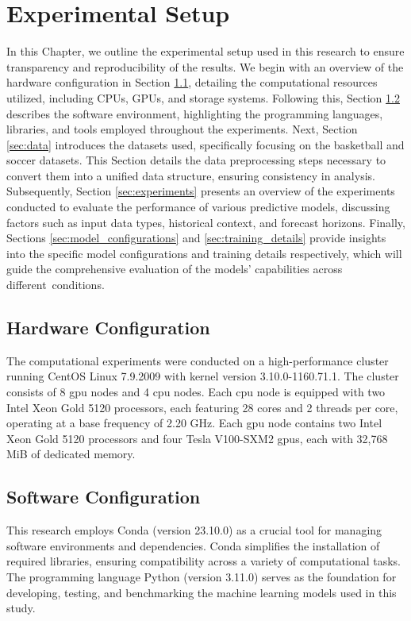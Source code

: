 \chapter{Experimental Setup}
\label{chapt:experimental_setup}
In this Chapter, we outline the experimental setup used in this research to ensure transparency and reproducibility of the results. We begin with an overview of the hardware configuration in Section \ref{sec:hardware}, detailing the computational resources utilized, including CPUs, GPUs, and storage systems. Following this, Section \ref{sec:software} describes the software environment, highlighting the programming languages, libraries, and tools employed throughout the experiments. Next, Section \ref{sec:data} introduces the datasets used, specifically focusing on the basketball and soccer datasets. This Section details the data preprocessing steps necessary to convert them into a unified data structure, ensuring consistency in analysis. Subsequently, Section \ref{sec:experiments} presents an overview of the experiments conducted to evaluate the performance of various predictive models, discussing factors such as input data types, historical context, and forecast horizons. Finally, Sections \ref{sec:model_configurations} and \ref{sec:training_details} provide insights into the specific model configurations and training details respectively, which will guide the comprehensive evaluation of the models' capabilities across different~conditions.


\section{Hardware Configuration}
\label{sec:hardware}
The computational experiments were conducted on a high-performance cluster running CentOS Linux 7.9.2009 with kernel version 3.10.0-1160.71.1. The cluster consists of 8 \gls{gpu} nodes and 4 \gls{cpu} nodes. Each \gls{cpu} node is equipped with two Intel Xeon Gold 5120 processors, each featuring 28 cores and 2 threads per core, operating at a base frequency of 2.20 GHz. Each \gls{gpu} node contains two Intel Xeon Gold 5120 processors and four Tesla V100-SXM2 \glspl{gpu}, each with 32,768 MiB of dedicated memory.

\section{Software Configuration}
\label{sec:software}

This research employs Conda (version 23.10.0) as a crucial tool for managing software environments and dependencies. Conda simplifies the installation of required libraries, ensuring compatibility across a variety of computational tasks. The programming language Python (version 3.11.0) serves as the foundation for developing, testing, and benchmarking the machine learning models used in this study.

